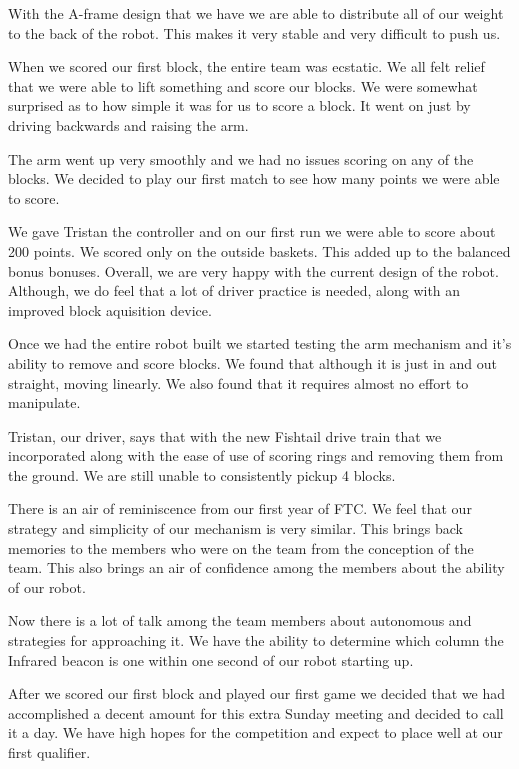 With the A-frame design that we have we are able to distribute all of our weight to the back of the robot. This makes it very stable and very difficult to push us. 

When we scored our first block, the entire team was ecstatic. We all felt relief that we were able to lift something and score our blocks. We were somewhat surprised as to how simple it was for us to score a block. It went on just by driving backwards and raising the arm.

The arm went up very smoothly and we had no issues scoring on any of the blocks. We decided to play our first match to see how many points we were able to score.

We gave Tristan the controller and on our first run we were able to score about 200 points. We scored only on the outside baskets. This added up to the balanced bonus bonuses. Overall, we are very happy with the current design of the robot. Although, we do feel that a lot of driver practice is needed, along with an improved block aquisition device. 

Once we had the entire robot built we started testing the arm mechanism and it's ability to remove and score blocks. We found that although it is just in and out straight, moving linearly. We also found that it requires almost no effort to manipulate.

Tristan, our driver, says that with the new Fishtail drive train that we incorporated along with the ease of use of scoring rings and removing them from the ground. We are still unable to consistently pickup 4 blocks. 

There is an air of reminiscence from our first year of FTC. We feel that our strategy and simplicity of our mechanism is very similar. This brings back memories to the members who were on the team from the conception of the team. This also brings an air of confidence among the members about the ability of our robot.

Now there is a lot of talk among the team members about autonomous and strategies for approaching it. We have the ability to determine which column the Infrared beacon is one within one second of our robot starting up.

After we scored our first block and played our first game we decided that we had accomplished a decent amount for this extra Sunday meeting and decided to call it a day. We have high hopes for the competition and expect to place well at our first qualifier. 